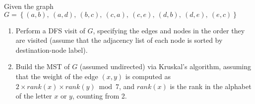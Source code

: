 \exercise

Given the graph $G = \left\{(a,b),\ (a,d),\ (b,c),\ (c,a),\ (c,e),\ (d,b),\
(d,e),\ (e,c) \right\}$
%
\begin{enumerate}

  \item Perform a DFS visit of $G$, specifying the edges and nodes in the order
  they are visited (assume that the adjacency list of each node is sorted by
  destination-node label).

  \item Build the MST of $G$ (assumed undirected) via Kruskal’s algorithm,
  assuming that the weight of the edge $(x,y)$ is computed as $2\times rank(x)
  \times rank(y) \bmod 7$, and $rank(x)$ is the rank in the alphabet of the
  letter $x$ or $y$, counting from 2.

\end{enumerate}

\solution

